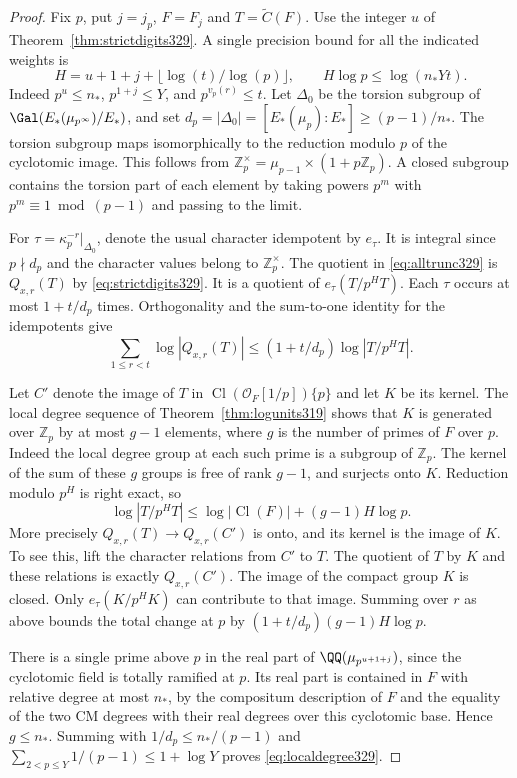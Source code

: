 \documentclass[a4paper,11pt]{article}
\theoremstyle{definition}
\theoremstyle{remark}
\newcommand{\ZZ}{\mathbb Z}\newcommand{\ord}{\operatorname{ord}}
\numberwithin{equation}{section}
\newcommand{\Cl}{\operatorname{Cl}}
\begin{document}
\begin{proof}
Fix \(p\), put \(j=j_p\), \(F=F_j\) and \(T=\widetilde C(F)\).
Use the integer \(u\) of Theorem~\ref{thm:strictdigits329}. A
single precision bound for all the indicated weights is
\[
 H=u+1+j+\lfloor\log(t)/\log(p)\rfloor,
 \qquad H\log p\le\log(n_*Yt).
\]
Indeed \(p^u\le n_*\), \(p^{1+j}\le Y\), and \(p^{v_p(r)}\le t\).
Let \(\Delta_0\) be the torsion subgroup of
\(\Gal(E_*(\mu_{p^\infty})/E_*)\), and set
\(d_p=|\Delta_0|=[E_*(\mu_p):E_*]\ge(p-1)/n_*\).
The torsion subgroup maps isomorphically to the reduction modulo
\(p\) of the cyclotomic image. This follows from
\(\ZZ_p^\times=\mu_{p-1}\times(1+p\ZZ_p)\). A closed subgroup
contains the torsion part of each element by taking powers
\(p^m\) with \(p^m\equiv1\bmod (p-1)\) and passing to the limit.

For \(\tau=\kappa_p^{-r}|_{\Delta_0}\), denote the usual character
idempotent by \(e_\tau\). It is integral since \(p\nmid d_p\) and
the character values belong to \(\ZZ_p^\times\).
The quotient in \eqref{eq:alltrunc329} is \(Q_{x,r}(T)\) by
\eqref{eq:strictdigits329}. It is a quotient of \(e_\tau(T/p^HT)\).
Each \(\tau\) occurs at most \(1+t/d_p\) times. Orthogonality and
the sum-to-one identity for the idempotents give
\[
 \sum_{1\le r<t}\log |Q_{x,r}(T)|
 \le (1+t/d_p)\log|T/p^HT|.
\]

Let \(C'\) denote the image of \(T\) in
\(\Cl(\mathcal O_F[1/p])\{p\}\) and let \(K\) be its kernel.
The local degree sequence of Theorem~\ref{thm:logunits319}
shows that \(K\) is generated over \(\ZZ_p\) by at most \(g-1\)
elements, where \(g\) is the number of primes of \(F\) over \(p\).
Indeed the local degree group at each such prime is a subgroup
of \(\ZZ_p\). The kernel of the sum of these \(g\) groups is
free of rank \(g-1\), and surjects onto \(K\). Reduction modulo
\(p^H\) is right exact, so
\[
 \log|T/p^HT|\le\log |\Cl(F)|+(g-1)H\log p.
\]
More precisely \(Q_{x,r}(T)\to Q_{x,r}(C')\) is onto, and its
kernel is the image of \(K\). To see this, lift the character
relations from \(C'\) to \(T\). The quotient of \(T\) by \(K\)
and these relations is exactly \(Q_{x,r}(C')\). The image of the
compact group \(K\) is closed. Only \(e_\tau(K/p^HK)\) can
contribute to that image. Summing over \(r\) as above bounds the
total change at \(p\) by \((1+t/d_p)(g-1)H\log p\).

There is a single prime above \(p\) in the real part of
\(\QQ(\mu_{p^{u+1+j}})\), since the cyclotomic field is totally
ramified at \(p\). Its real part is contained in \(F\) with
relative degree at most \(n_*\), by the compositum description
of \(F\) and the equality of the two CM degrees with their
real degrees over this cyclotomic base. Hence \(g\le n_*\).
Summing with \(1/d_p\le n_* /(p-1)\) and
\(\sum_{2<p\le Y}1/(p-1)\le1+\log Y\) proves
\eqref{eq:localdegree329}.


\end{proof}
\end{document}
